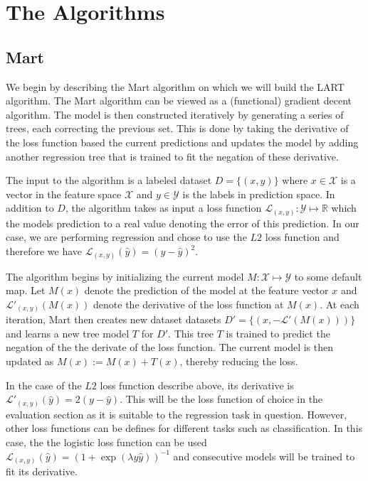 \documentclass{article} %
\begin{document}
\section{The Algorithms} \label{sec:algo}

\subsection{Mart}
We begin by describing the Mart\cite{mart} algorithm on which we will build the LART algorithm. The Mart algorithm can be viewed as a (functional) gradient decent algorithm. The model is then constructed iteratively by generating a series of trees, each correcting the previous set. This is done by taking the derivative of the loss function based the current predictions and updates the model by adding another regression tree that is trained to fit the negation of these derivative. 

The input to the algorithm is a labeled dataset $D=\{(x,y)\}$ where $x\in \mathcal{X}$ is a vector in the feature space $\mathcal{X}$ and $y\in \mathcal{Y}$ is the labels in prediction space. In addition to $D$, the algorithm takes as input a loss function $\mathcal{L}_{(x,y)} :  \mathcal{Y} \mapsto \mathds{R} $ which the models prediction to a real value denoting the error of this prediction. In our case, we are performing regression and chose to use the $L2$ loss function and therefore we have $\mathcal{L}_{(x,y)}(\hat{y} ) = (y- \hat{y})^2$.
 
 
The algorithm begins by initializing the current model $M:\mathcal{X}\mapsto \mathcal{Y}$ to some default map. Let $M(x)$ denote the prediction of the model at the feature vector $x$ and $\mathcal{L}'_{(x,y)}(M(x))$ denote the derivative of the loss function at $M(x)$. At each iteration, Mart then creates new dataset datasets $D'=\{(x,-\mathcal{L}'(M(x)))\}$  and learns a new tree model $T$ for $D'$. This tree $T$ is trained to predict the negation of the the derivate of the loss function. The current model is then updated as $M(x):= M(x) + T(x)$, thereby reducing the loss.

In the case of the $L2$ loss function describe above, its derivative is $\mathcal{L}'_{(x,y)}(\hat{y}) = 2(y - \hat{y})$. This will be the loss function of choice in the evaluation section as it is suitable to the regression task in question. However, other loss functions can be defines for different tasks such as classification. In this case, the  the logistic loss function can be used $\mathcal{L}_{(x,y)} (\hat{y}) =( 1 + \exp(\lambda y \hat{y}))^{-1}$ and consecutive models will be trained to fit its derivative.
\end{document}
